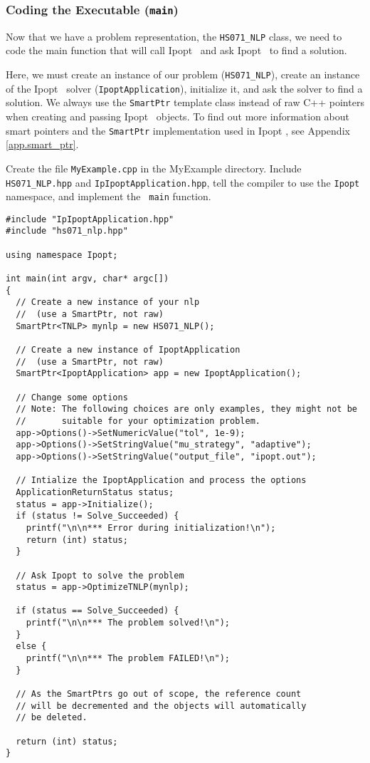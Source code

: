 \documentclass[10pt]{article}
\newcommand{\Ipopt}{{\sc Ipopt }}
\begin{document}
\subsubsection{Coding the Executable (\texttt{main})}
Now that we have a problem representation, the {\tt HS071\_NLP} class,
we need to code the main function that will call \Ipopt\ and ask \Ipopt\
to find a solution.

Here, we must create an instance of our problem ({\tt HS071\_NLP}),
create an instance of the \Ipopt\ solver (\texttt{IpoptApplication}),
initialize it, and ask the solver to find a solution. We always use
the \texttt{SmartPtr} template class instead of raw C++ pointers when
creating and passing \Ipopt\ objects. To find out more information
about smart pointers and the {\tt SmartPtr} implementation used in
\Ipopt, see Appendix \ref{app.smart_ptr}.

Create the file {\tt MyExample.cpp} in the MyExample directory.
Include {\tt HS071\_NLP.hpp} and {\tt IpIpoptApplication.hpp}, tell
the compiler to use the {\tt Ipopt} namespace, and implement the {\tt
  main} function.

\begin{footnotesize}
\begin{verbatim}
#include "IpIpoptApplication.hpp"
#include "hs071_nlp.hpp"

using namespace Ipopt;

int main(int argv, char* argc[])
{
  // Create a new instance of your nlp 
  //  (use a SmartPtr, not raw)
  SmartPtr<TNLP> mynlp = new HS071_NLP();

  // Create a new instance of IpoptApplication
  //  (use a SmartPtr, not raw)
  SmartPtr<IpoptApplication> app = new IpoptApplication();

  // Change some options
  // Note: The following choices are only examples, they might not be
  //       suitable for your optimization problem.
  app->Options()->SetNumericValue("tol", 1e-9);
  app->Options()->SetStringValue("mu_strategy", "adaptive");
  app->Options()->SetStringValue("output_file", "ipopt.out");

  // Intialize the IpoptApplication and process the options
  ApplicationReturnStatus status;
  status = app->Initialize();
  if (status != Solve_Succeeded) {
    printf("\n\n*** Error during initialization!\n");
    return (int) status;
  }

  // Ask Ipopt to solve the problem
  status = app->OptimizeTNLP(mynlp);

  if (status == Solve_Succeeded) {
    printf("\n\n*** The problem solved!\n");
  }
  else {
    printf("\n\n*** The problem FAILED!\n");
  }

  // As the SmartPtrs go out of scope, the reference count
  // will be decremented and the objects will automatically 
  // be deleted.

  return (int) status;
}
\end{verbatim} 
\end{footnotesize}
\end{document}
